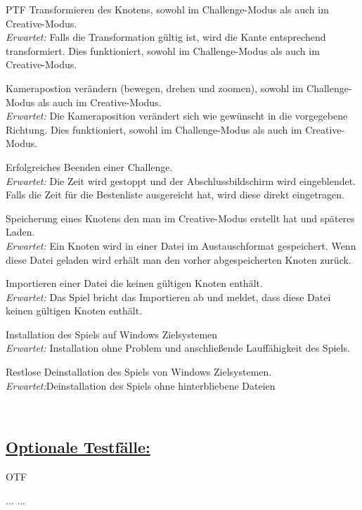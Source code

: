 \begin{ids}{\gls{PTF}}
	\id[70] Transformieren des Knotens, sowohl im Challenge-Modus als auch im Creative-Modus.\\
\textit{Erwartet:} Falls die Transformation gültig ist, wird die Kante entsprechend transformiert. Dies funktioniert, sowohl im Challenge-Modus als auch im Creative-Modus.

	\id[80] Kamerapostion verändern (bewegen, drehen und zoomen), sowohl im Challenge-Modus als auch im Creative-Modus.\\
\textit{Erwartet:} Die Kameraposition verändert sich wie gewünscht in die vorgegebene Richtung. Dies funktioniert, sowohl im Challenge-Modus als auch im Creative-Modus.

	\id[90] Erfolgreiches Beenden einer Challenge. \\
\textit{Erwartet:} Die Zeit wird gestoppt und der Abschlussbildschirm wird eingeblendet. Falls die Zeit für die Bestenliste ausgereicht hat, wird diese direkt eingetragen.

	\id[100] Speicherung eines Knotens den man im Creative-Modus erstellt hat und späteres Laden.\\
\textit{Erwartet:} Ein Knoten wird in einer Datei im Austauschformat gespeichert. Wenn diese Datei geladen wird erhält man den vorher abgespeicherten Knoten zurück.

	\id[110] Importieren einer Datei die keinen gültigen Knoten enthält.\\
\textit{Erwartet:} Das Spiel bricht das Importieren ab und meldet, dass diese Datei keinen gültigen Knoten enthält.

	\id[120] Installation des Spiels auf Windows Zielsystemen\\
\textit{Erwartet:} Installation ohne Problem und anschließende Lauffähigkeit des Spiels.

	\id[130] Restlose Deinstallation des Spiels von Windows Zielsystemen.\\
\textit{Erwartet:}Deinstallation des Spiels ohne hinterbliebene Dateien

\end{ids}

~\\

\subsection*{\underline{Optionale Testfälle:}}

\begin{ids}{\gls{OTF}}

	\id[ 11] ...
	\id[100] ...

\end{ids}
